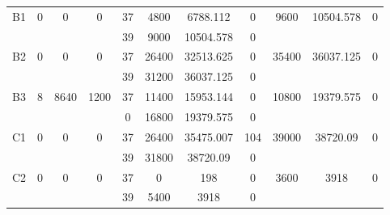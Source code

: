 \begin{sidewaystable}
\begin{tabular}{c||c|c|c||c|c|c|c||c|c|c}
        
      \\
      \hline
      \multirow{2}{*}{B1} &
      \multirow{2}{*}{0} &
      \multirow{2}{*}{0} &
      \multirow{2}{*}{0} &
      37 &
      4800 &
        6788.112 &
        0 &
      \multirow{2}{*}{9600} &
        \multirow{2}{*}{10504.578} &
        \multirow{2}{*}{0}
      \\
      \cline{5-8}
       &
       &
       &
       &
      39 &
      9000 &
        10504.578 &
        0 &
      
         &
        
      \\
      \hline
      \multirow{2}{*}{B2} &
      \multirow{2}{*}{0} &
      \multirow{2}{*}{0} &
      \multirow{2}{*}{0} &
      37 &
      26400 &
        32513.625 &
        0 &
      \multirow{2}{*}{35400} &
        \multirow{2}{*}{36037.125} &
        \multirow{2}{*}{0}
      \\
      \cline{5-8}
       &
       &
       &
       &
      39 &
      31200 &
        36037.125 &
        0 &
      
         &
        
      \\
      \hline
      \multirow{2}{*}{B3} &
      \multirow{2}{*}{8} &
      \multirow{2}{*}{8640} &
      \multirow{2}{*}{1200} &
      37 &
      11400 &
        15953.144 &
        0 &
      \multirow{2}{*}{10800} &
        \multirow{2}{*}{19379.575} &
        \multirow{2}{*}{0}
      \\
      \cline{5-8}
       &
       &
       &
       &
      0 &
      16800 &
        19379.575 &
        0 &
      
         &
        
      \\
      \hline
      \multirow{2}{*}{C1} &
      \multirow{2}{*}{0} &
      \multirow{2}{*}{0} &
      \multirow{2}{*}{0} &
      37 &
      26400 &
        35475.007 &
        104 &
      \multirow{2}{*}{39000} &
        \multirow{2}{*}{38720.09} &
        \multirow{2}{*}{0}
      \\
      \cline{5-8}
       &
       &
       &
       &
      39 &
      31800 &
        38720.09 &
        0 &
      
         &
        
      \\
      \hline
      \multirow{2}{*}{C2} &
      \multirow{2}{*}{0} &
      \multirow{2}{*}{0} &
      \multirow{2}{*}{0} &
      37 &
      0 &
        198 &
        0 &
      \multirow{2}{*}{3600} &
        \multirow{2}{*}{3918} &
        \multirow{2}{*}{0}
      \\
      \cline{5-8}
       &
       &
       &
       &
      39 &
      5400 &
        3918 &
        0 &
      

\end{tabular}
\end{sidewaystable}
